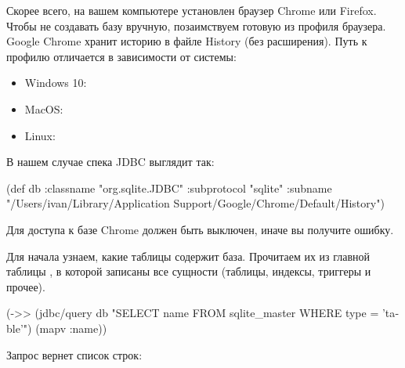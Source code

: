 \begin{english}
  \begin{clojure}
  \end{clojure}
\end{english}

Скорее всего, на вашем компьютере установлен браузер Chrome или Firefox. Чтобы не создавать базу вручную, позаимствуем готовую из профиля браузера. Google Chrome хранит историю в файле History (без расширения). Путь к профилю отличается в зависимости от системы:

\begin{itemize}

\item
  Windows 10: 

\item
  MacOS: 

\item
 Linux: 

\end{itemize}

В нашем случае спека JDBC выглядит так:

\begin{english}
  \begin{clojure}
(def db
  {:classname "org.sqlite.JDBC"
   :subprotocol "sqlite"
   :subname "/Users/ivan/Library/Application Support/Google/Chrome/Default/History"})
  \end{clojure}
\end{english}

Для доступа к базе Chrome должен быть выключен, иначе вы получите ошибку.

Для начала узнаем, какие таблицы содержит база. Прочитаем их из главной таблицы , в которой записаны все сущности (таблицы, индексы, триггеры и прочее).

\begin{english}
  \begin{clojure}
(->> (jdbc/query db "SELECT name FROM sqlite_master WHERE type = 'table'")
     (mapv :name))
  \end{clojure}
\end{english}

Запрос вернет список строк:

